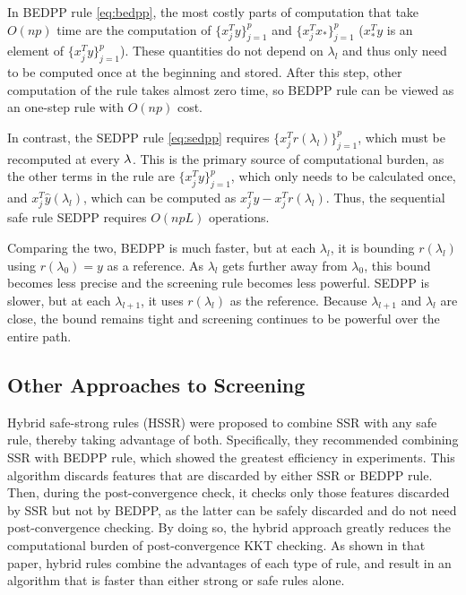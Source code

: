 In BEDPP rule \eqref{eq:bedpp}, the most costly parts of computation that take $O(np)$ time are the computation of $\{x_j^Ty\}_{j=1}^p$ and $\{x_j^Tx_*\}_{j=1}^p$ ($x_*^Ty$ is an element of $\{x_j^Ty\}_{j=1}^p$). These quantities do not depend on $\lambda_l$ and thus only need to be computed once at the beginning and stored. After this step, other computation of the rule takes almost zero time, so BEDPP rule can be viewed as an one-step rule with $O(np)$ cost.

In contrast, the SEDPP rule \eqref{eq:sedpp} requires $\{x_j^Tr(\lambda_l)\}_{j=1}^p$, which must be recomputed at every $\lambda$.  This is the primary source of computational burden, as the other terms in the rule are $\{x_j^Ty\}_{j=1}^p$, which only needs to be calculated once, and $x_j^T\hat{y}(\lambda_l)$, which can be computed as $x_j^Ty-x_j^Tr(\lambda_l)$. Thus, the sequential safe rule SEDPP requires $O(npL)$ operations.

Comparing the two, BEDPP is much faster, but at each $\lambda_l$, it is bounding $r(\lambda_l)$ using $r(\lambda_0)=y$ as a reference. As $\lambda_l$ gets further away from $\lambda_0$, this bound becomes less precise and the screening rule becomes less powerful. SEDPP is slower, but at each $\lambda_{l+1}$, it uses $r(\lambda_{l})$ as the reference. Because $\lambda_{l+1}$ and $\lambda_l$ are close, the bound remains tight and screening continues to be powerful over the entire path.

\subsection{Other Approaches to Screening}

Hybrid safe-strong rules (HSSR) \citep{Zeng2021} were proposed to combine SSR with any safe rule, thereby taking advantage of both. Specifically, they recommended combining SSR with BEDPP rule, which showed the greatest efficiency in experiments. This algorithm discards features that are discarded by either SSR or BEDPP rule. Then, during the post-convergence check, it checks only those features discarded by SSR but not by BEDPP, as the latter can be safely discarded and do not need post-convergence checking. By doing so, the hybrid approach greatly reduces the computational burden of post-convergence KKT checking.  As shown in that paper, hybrid rules combine the advantages of each type of rule, and result in an algorithm that is faster than either strong or safe rules alone.

